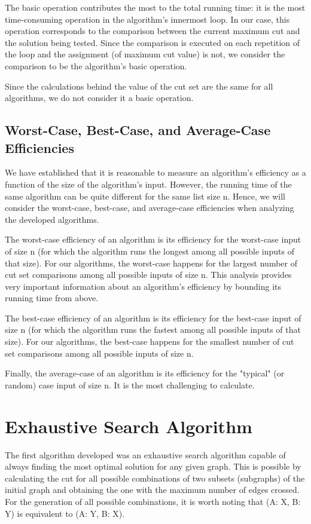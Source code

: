 \documentclass[]{revdetua}
\begin{document}
The basic operation contributes the most to the total running time: it is the most time-consuming operation in the algorithm’s innermost loop. In our case, this operation corresponds to the comparison between the current maximum cut and the solution being tested. Since the comparison is executed on each repetition of the loop and the assignment (of maximum cut value) is not, we consider the comparison to be the algorithm’s basic operation. 

Since the calculations behind the value of the cut set are the same for all algorithms, we do not consider it a basic operation.

\subsection{Worst-Case, Best-Case, and Average-Case Efficiencies}

We have established that it is reasonable to measure an algorithm’s efficiency as a function of the size of the algorithm’s input. However, the running time of the same algorithm can be quite different for the same list size n. Hence, we will consider the worst-case, best-case, and average-case efficiencies when analyzing the developed algorithms.

The worst-case efficiency of an algorithm is its efficiency for the worst-case input of size n (for which the algorithm runs the longest among all possible inputs of that size). For our algorithms, the worst-case happens for the largest number of cut set comparisons among all possible inputs of size n. This analysis provides very important information about an algorithm’s efficiency by bounding its running time from above. 

The best-case efficiency of an algorithm is its efficiency for the best-case input of size n (for which the algorithm runs the fastest among all possible inputs of that size). For our algorithms, the best-case happens for the smallest number of cut set comparisons among all possible inputs of size n.

Finally, the average-case of an algorithm is its efficiency for the "typical" (or random) case input of size n. It is the most challenging to calculate.

\section{Exhaustive Search Algorithm}

The first algorithm developed was an exhaustive search algorithm capable of always finding the most optimal solution for any given graph. This is possible by calculating the cut for all possible combinations of two subsets (subgraphs) of the initial graph and obtaining the one with the maximum number of edges crossed. For the generation of all possible combinations, it is worth noting that (A: X, B: Y) is equivalent to (A: Y, B: X).
\end{document}
